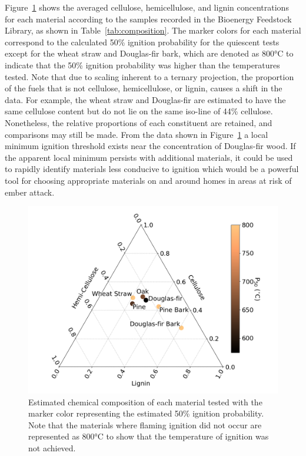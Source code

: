     Figure~\ref{fig:composition_plot} shows the averaged cellulose, hemicellulose, and lignin concentrations for each material according to the samples recorded in the Bioenergy Feedstock Library, as shown in Table~\ref{tab:composition}. The marker colors for each material correspond to the calculated 50\% ignition probability for the quiescent tests except for the wheat straw and Douglas-fir bark, which are denoted as 800\si{\celsius} to indicate that the 50\% ignition probability was higher than the temperatures tested. Note that due to scaling inherent to a ternary projection, the proportion of the fuels that is not cellulose, hemicellulose, or lignin, causes a shift in the data. For example, the wheat straw and Douglas-fir are estimated to have the same cellulose content but do not lie on the same iso-line of 44\% cellulose. Nonetheless, the relative proportions of each constituent are retained, and comparisons may still be made. From the data shown in Figure~\ref{fig:composition_plot} a local minimum ignition threshold exists near the concentration of Douglas-fir wood. If the apparent local minimum persists with additional materials, it could be used to rapidly identify materials less conducive to ignition which would be a powerful tool for choosing appropriate materials on and around homes in areas at risk of ember attack. 
        \begin{figure}[htpb]
            \centering
            \includegraphics[width=0.75\columnwidth]{Figures/speciesStudyTernaryDiss.png}
            \caption{Estimated chemical composition of each material tested with the marker color representing the estimated 50\% ignition probability. Note that the materials where flaming ignition did not occur are represented as 800\si{\celsius} to show that the temperature of ignition was not achieved.}
            \label{fig:composition_plot}
        \end{figure}
    

